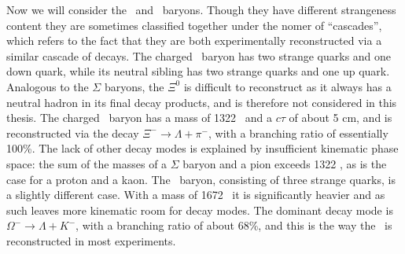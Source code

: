       Now we will consider the \Xi\ and \Omega\ baryons. Though they have different strangeness content they are sometimes classified together under the nomer of ``cascades'', which refers to the fact that they are both experimentally reconstructed via a similar cascade of decays. The charged \Xi\ baryon has two strange quarks and one down quark, while its neutral sibling has two strange quarks and one up quark. Analogous to the $\Sigma$ baryons, the $\Xi^0$ is difficult to reconstruct as it always has a neutral hadron in its final decay products, and is therefore not considered in this thesis. The charged \Xi\ baryon has a mass of 1322 \mev\ and a $c\tau$ of about 5 cm, and is reconstructed via the decay $\Xi^- \rightarrow \Lambda + \pi^-$, with a branching ratio of essentially 100\%. The lack of other decay modes is explained by insufficient kinematic phase space: the sum of the masses of a $\Sigma$ baryon and a pion exceeds 1322 \mev, as is the case for a proton and a kaon. The \Omega\ baryon, consisting of three strange quarks, is a slightly different case. With a mass of 1672 \mev\ it is significantly heavier and as such leaves more kinematic room for decay modes. The dominant decay mode is $\Omega^- \rightarrow \Lambda + K^-$, with a branching ratio of about 68\%, and this is the way the \Omega\ is reconstructed in most experiments.  %


